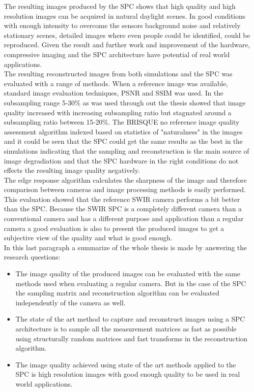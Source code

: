 The resulting images produced by the SPC shows that high quality and high resolution images can be acquired in natural daylight scenes. In good conditions with enough intensity to overcome the sensors background noise and relatively stationary scenes, detailed images where even people could be identified, could be reproduced. Given the result and further work and improvement of the hardware, compressive imaging and the SPC architecture have potential of real world applications.\\[0.1in]

The resulting reconstructed images from both simulations and the SPC was evaluated with a range of methods. When a reference image was available, standard image evaluation techniques, PSNR and SSIM was used. In the subsampling range 5-30\% as was used through out the thesis showed that image quality increased with increasing subsampling ratio but stagnated around a subsampling ratio between 15-20\%. The BRISQUE no reference image quality assessment algorithm indexed based on statistics of "naturalness" in the images and it could be seen that the SPC could get the same results as the best in the simulations indicating that the sampling and reconstruction is the main source of image degradiation and that the SPC hardware in the right conditions do not effects the resulting image quality negatively.\\[0.1in] 

The edge response algorithm calculates the sharpness of the image and therefore comparison between cameras and image processing methods is easily performed. This evaluation showed that the reference SWIR camera performs a bit better than the SPC. Because the SWIR SPC is a completely different camera than a conventional camera and has a different purpose and application than a regular camera a good evaluation is also to present the produced images to get a subjective view of the quality and what is good enough.\\[0.1in]


In this last paragraph a summarize of the whole thesis is made by answering the research questions:


\begin{itemize}
    \item The image quality of the produced images can be evaluated with the same methods used when evaluating a regular camera. But in the case of the SPC the sampling matrix and reconstruction algorithm can be evaluated independently of the camera as well.
    
    \item The state of the art method to capture and reconstruct images using a SPC architecture is to sample all the measurement matrices as fast as possible using structurally random matrices and fast transforms in the reconstruction algorithm.
    
    \item The image quality achieved using state of the art methods applied to the SPC is high resolution images with good enough quality to be used in real world applications. 
\end{itemize}







